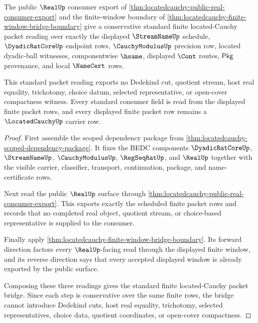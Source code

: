 \begin{theorem}
\label{thm:locatedcauchy-standard-finite-packet-bridge}
The public $\RealUp$ consumer export of
\autoref{thm:locatedcauchy-public-real-consumer-export} and the finite-window
boundary of \autoref{thm:locatedcauchy-finite-window-bridge-boundary} give a
conservative standard finite located-Cauchy packet reading over exactly the
displayed $\StreamNameUp$ schedule, $\DyadicRatCoreUp$ endpoint rows,
$\CauchyModulusUp$ precision row, located dyadic-ball witnesses,
componentwise $\hsame$, displayed $\Cont$ routes, $\mathsf{Pkg}$ provenance,
and local $\NameCert$ rows.

This standard packet reading exports no Dedekind cut, quotient stream, host
real equality, trichotomy, choice datum, selected representative, or open-cover
compactness witness. Every standard consumer field is read from the displayed
finite packet rows, and every displayed finite packet row remains a
$\LocatedCauchyUp$ carrier row.
\end{theorem}
\begin{proof}
First assemble the scoped dependency package from
\autoref{thm:locatedcauchy-scoped-dependency-package}. It fixes the BEDC
components $\DyadicRatCoreUp$, $\StreamNameUp$, $\CauchyModulusUp$,
$\RegSeqRatUp$, and $\RealUp$ together with the visible carrier, classifier,
transport, continuation, package, and name-certificate rows.

Next read the public $\RealUp$ surface through
\autoref{thm:locatedcauchy-public-real-consumer-export}. This exports exactly
the scheduled finite packet rows and records that no completed real object,
quotient stream, or choice-based representative is supplied to the consumer.

Finally apply \autoref{thm:locatedcauchy-finite-window-bridge-boundary}. Its
forward direction factors every $\RealUp$-facing read through the displayed
finite window, and its reverse direction says that every accepted displayed
window is already exported by the public surface.

Composing these three readings gives the standard finite located-Cauchy packet
bridge. Since each step is conservative over the same finite rows, the bridge
cannot introduce Dedekind cuts, host real equality, trichotomy, selected
representatives, choice data, quotient coordinates, or open-cover compactness.
\end{proof}

